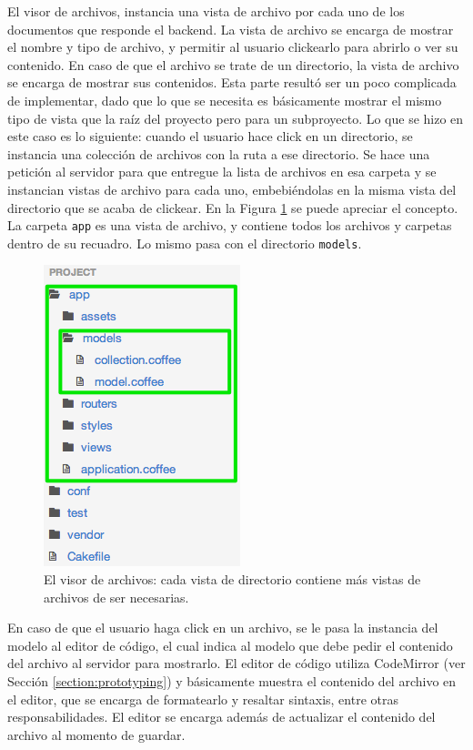 \documentclass[12pt,spanish,letter]{report}
\makeatletter
\def\maxwidth{\ifdim\Gin@nat@width>\linewidth\linewidth
\else\Gin@nat@width\fi}
\let\Oldincludegraphics\includegraphics
\renewcommand{\includegraphics}[1]{\Oldincludegraphics[width=\maxwidth]{#1}}
\makeatother
\begin{document}
El visor de archivos, instancia una vista de archivo por cada uno de los
documentos que responde el backend. La vista de archivo se encarga de
mostrar el nombre y tipo de archivo, y permitir al usuario clickearlo
para abrirlo o ver su contenido. En caso de que el archivo se trate de
un directorio, la vista de archivo se encarga de mostrar sus contenidos.
Esta parte resultó ser un poco complicada de implementar, dado que lo
que se necesita es básicamente mostrar el mismo tipo de vista que la
raíz del proyecto pero para un subproyecto. Lo que se hizo en este caso
es lo siguiente: cuando el usuario hace click en un directorio, se
instancia una colección de archivos con la ruta a ese directorio. Se
hace una petición al servidor para que entregue la lista de archivos en
esa carpeta y se instancian vistas de archivo para cada uno,
embebiéndolas en la misma vista del directorio que se acaba de clickear.
En la Figura \ref{figure:file-browser} se puede apreciar el concepto. La
carpeta \texttt{app} es una vista de archivo, y contiene todos los
archivos y carpetas dentro de su recuadro. Lo mismo pasa con el
directorio \texttt{models}.

\begin{figure}[htbp]
\centering
\includegraphics{figures/file-browser.png}
\caption{El visor de archivos: cada vista de directorio contiene más
vistas de archivos de ser necesarias. \label{figure:file-browser}}
\end{figure}

En caso de que el usuario haga click en un archivo, se le pasa la
instancia del modelo al editor de código, el cual indica al modelo que
debe pedir el contenido del archivo al servidor para mostrarlo. El
editor de código utiliza CodeMirror (ver Sección
\ref{section:prototyping}) y básicamente muestra el contenido del
archivo en el editor, que se encarga de formatearlo y resaltar sintaxis,
entre otras responsabilidades. El editor se encarga además de actualizar
el contenido del archivo al momento de guardar.
\end{document}
